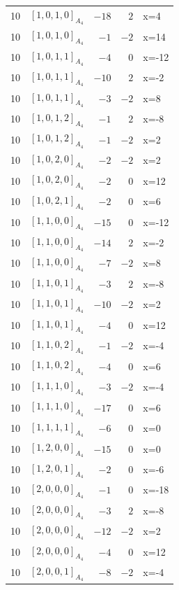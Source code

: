 \documentclass[11pt]{article}
\newcommand{\Dynkin}[1]{#1}
\begin{document}
\begin{longtable}{r l r r l}
10 & $\Dynkin{[1,0,1,0]_{A_4}}$ & $-18$ & $2$ & x=4\\
10 & $\Dynkin{[1,0,1,0]_{A_4}}$ & $-1$ & $-2$ & x=14\\
10 & $\Dynkin{[1,0,1,1]_{A_4}}$ & $-4$ & $0$ & x=-12\\
10 & $\Dynkin{[1,0,1,1]_{A_4}}$ & $-10$ & $2$ & x=-2\\
10 & $\Dynkin{[1,0,1,1]_{A_4}}$ & $-3$ & $-2$ & x=8\\
10 & $\Dynkin{[1,0,1,2]_{A_4}}$ & $-1$ & $2$ & x=-8\\
10 & $\Dynkin{[1,0,1,2]_{A_4}}$ & $-1$ & $-2$ & x=2\\
10 & $\Dynkin{[1,0,2,0]_{A_4}}$ & $-2$ & $-2$ & x=2\\
10 & $\Dynkin{[1,0,2,0]_{A_4}}$ & $-2$ & $0$ & x=12\\
10 & $\Dynkin{[1,0,2,1]_{A_4}}$ & $-2$ & $0$ & x=6\\
10 & $\Dynkin{[1,1,0,0]_{A_4}}$ & $-15$ & $0$ & x=-12\\
10 & $\Dynkin{[1,1,0,0]_{A_4}}$ & $-14$ & $2$ & x=-2\\
10 & $\Dynkin{[1,1,0,0]_{A_4}}$ & $-7$ & $-2$ & x=8\\
10 & $\Dynkin{[1,1,0,1]_{A_4}}$ & $-3$ & $2$ & x=-8\\
10 & $\Dynkin{[1,1,0,1]_{A_4}}$ & $-10$ & $-2$ & x=2\\
10 & $\Dynkin{[1,1,0,1]_{A_4}}$ & $-4$ & $0$ & x=12\\
10 & $\Dynkin{[1,1,0,2]_{A_4}}$ & $-1$ & $-2$ & x=-4\\
10 & $\Dynkin{[1,1,0,2]_{A_4}}$ & $-4$ & $0$ & x=6\\
10 & $\Dynkin{[1,1,1,0]_{A_4}}$ & $-3$ & $-2$ & x=-4\\
10 & $\Dynkin{[1,1,1,0]_{A_4}}$ & $-17$ & $0$ & x=6\\
10 & $\Dynkin{[1,1,1,1]_{A_4}}$ & $-6$ & $0$ & x=0\\
10 & $\Dynkin{[1,2,0,0]_{A_4}}$ & $-15$ & $0$ & x=0\\
10 & $\Dynkin{[1,2,0,1]_{A_4}}$ & $-2$ & $0$ & x=-6\\
10 & $\Dynkin{[2,0,0,0]_{A_4}}$ & $-1$ & $0$ & x=-18\\
10 & $\Dynkin{[2,0,0,0]_{A_4}}$ & $-3$ & $2$ & x=-8\\
10 & $\Dynkin{[2,0,0,0]_{A_4}}$ & $-12$ & $-2$ & x=2\\
10 & $\Dynkin{[2,0,0,0]_{A_4}}$ & $-4$ & $0$ & x=12\\
10 & $\Dynkin{[2,0,0,1]_{A_4}}$ & $-8$ & $-2$ & x=-4\\

\end{longtable}
\end{document}
